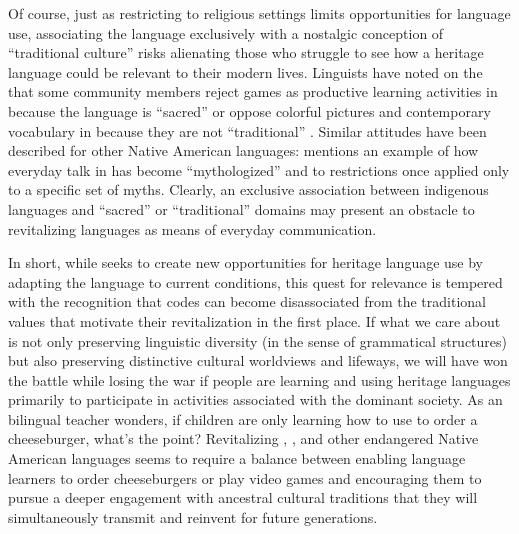 \documentclass[output=paper]{LSP/langsci}
\begin{document}
Of course, just as restricting  to religious settings limits opportunities for language use, associating the language exclusively with a nostalgic conception of ``traditional culture'' risks alienating those who struggle to see how a heritage language could be relevant to their modern lives. Linguists have noted on the  that some community members reject games as productive learning activities in  because the language is ``sacred'' or oppose colorful pictures and contemporary vocabulary in  because they are not ``traditional'' \citep{deReuse2014b, Ullrich2014a, Ullrich2014b}. Similar attitudes have been described for other Native American languages:  mentions an example of how everyday talk in  has become ``mythologized'' and  to restrictions once applied only to a specific set of myths. Clearly, an exclusive association between indigenous languages and ``sacred'' or ``traditional'' domains may present an obstacle to revitalizing languages as means of everyday communication.

In short, while  seeks to create new opportunities for heritage language use by adapting the language to current conditions, this quest for relevance is tempered with the recognition that codes can become disassociated from the traditional values that motivate their revitalization in the first place. If what we care about is not only preserving linguistic diversity (in the sense of grammatical structures) but also preserving distinctive cultural worldviews and lifeways, we will have won the battle while losing the war if people are learning and using heritage languages primarily to participate in activities associated with the dominant society. As an  bilingual teacher wonders, if children are only learning how to use  to order a cheeseburger, what's the point? \citep[551]{Samuels2006} Revitalizing , , and other endangered Native American languages seems to require a balance between enabling language learners to order cheeseburgers or play video games and encouraging them to pursue a deeper engagement with ancestral cultural traditions that they will simultaneously transmit and reinvent for future generations.
\end{document}
